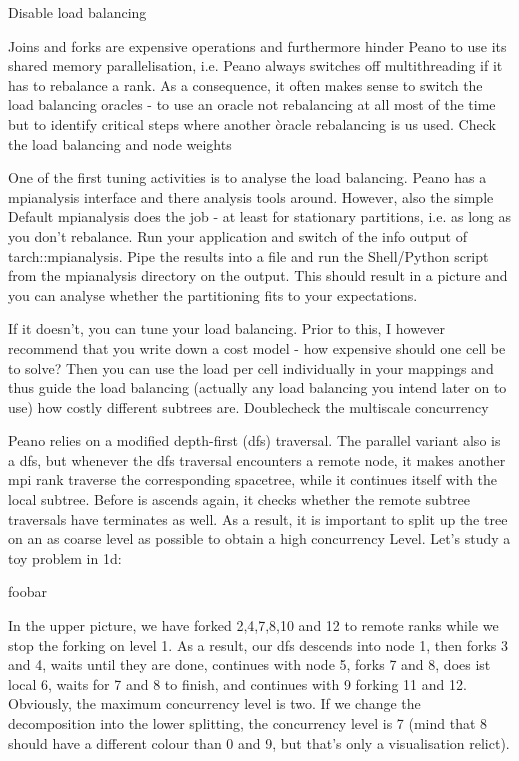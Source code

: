 Disable load balancing

Joins and forks are expensive operations and furthermore hinder Peano to use its shared memory parallelisation, i.e. Peano always switches off multithreading if it has to rebalance a rank. As a consequence, it often makes sense to switch the load balancing oracles - to use an oracle not rebalancing at all most of the time but to identify critical steps where another òracle rebalancing is us used.
Check the load balancing and node weights

One of the first tuning activities is to analyse the load balancing. Peano has a mpianalysis interface and there analysis tools around. However, also the simple Default mpianalysis does the job - at least for stationary partitions, i.e. as long as you don't rebalance. Run your application and switch of the info output of tarch::mpianalysis. Pipe the results into a file and run the Shell/Python script from the mpianalysis directory on the output. This should result in a picture and you can analyse whether the partitioning fits to your expectations.

If it doesn't, you can tune your load balancing. Prior to this, I however recommend that you write down a cost model - how expensive should one cell be to solve? Then you can use the load per cell individually in your mappings and thus guide the load balancing (actually any load balancing you intend later on to use) how costly different subtrees are.
Doublecheck the multiscale concurrency

Peano relies on a modified depth-first (dfs) traversal. The parallel variant also is a dfs, but whenever the dfs traversal encounters a remote node, it makes another mpi rank traverse the corresponding spacetree, while it continues itself with the local subtree. Before is ascends again, it checks whether the remote subtree traversals have terminates as well. As a result, it is important to split up the tree on an as coarse level as possible to obtain a high concurrency Level. Let's study a toy problem in 1d:

foobar

In the upper picture, we have forked 2,4,7,8,10 and 12 to remote ranks while we stop the forking on level 1. As a result, our dfs descends into node 1, then forks 3 and 4, waits until they are done, continues with node 5, forks 7 and 8, does ist local 6, waits for 7 and 8 to finish, and continues with 9 forking 11 and 12. Obviously, the maximum concurrency level is two. If we change the decomposition into the lower splitting, the concurrency level is 7 (mind that 8 should have a different colour than 0 and 9, but that's only a visualisation relict).

